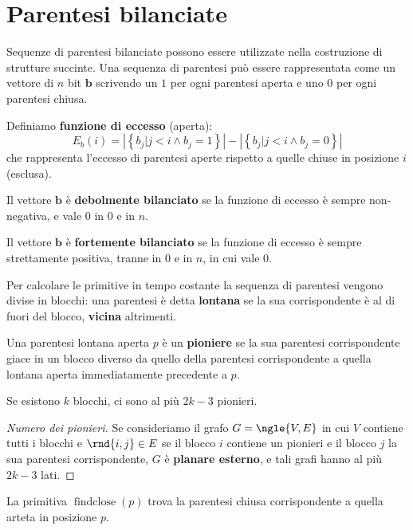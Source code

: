 \documentclass[\main/main.tex]{subfiles}
\begin{document}
\section{Parentesi bilanciate}
\begin{multicols}{2}
\begin{definition}
    Sequenze di parentesi bilanciate possono essere utilizzate nella costruzione di strutture succinte. Una sequenza di parentesi può essere rappresentata come un vettore di \(n\) bit \(\bm{b}\) scrivendo un \(1\) per ogni parentesi aperta e uno \(0\) per ogni parentesi chiusa.
\end{definition}
\begin{definition}
    Definiamo \textbf{funzione di eccesso} (aperta):
    \[
        E_{b}(i)=\left|\left\{b_{j} | j<i \wedge b_{j}=1\right\}\right|-\left|\left\{b_{j} | j<i \wedge b_{j}=0\right\}\right|
    \]
    che rappresenta l'eccesso di parentesi aperte rispetto a quelle chiuse in posizione \(i\) (esclusa).
\end{definition}
\begin{property}
    Il vettore \(\bm{b}\) è \textbf{debolmente bilanciato} se la funzione di eccesso è sempre non-negativa, e vale \(0\) in \(0\) e in \(n\).
\end{property}
\begin{property}
    Il vettore \(\bm{b}\) è \textbf{fortemente bilanciato} se la funzione di eccesso è sempre strettamente positiva, tranne in \(0\) e in \(n\), in cui vale 0.
\end{property}
\begin{definition}
    Per calcolare le primitive in tempo costante la sequenza di parentesi vengono divise in blocchi: una parentesi è detta \textbf{lontana} se la sua corrispondente è al di fuori del blocco, \textbf{vicina} altrimenti.
\end{definition}
\begin{definition}[Pioniere]
    Una parentesi lontana aperta \(p\) è un \textbf{pioniere} se la sua parentesi corrispondente giace in un blocco diverso da quello della parentesi corrispondente a quella lontana aperta immediatamente precedente a \(p\).
\end{definition}
\begin{lemma}
    Se esistono \(k\) blocchi, ci sono al più \(2k-3\) pionieri.
\end{lemma}
\begin{proof}[Numero dei pionieri]
    Se consideriamo il grafo \(G = \ngle{V, E}\) in cui \(V\) contiene tutti i blocchi e \(\rnd{i,j} \in E\) se il blocco \(i\) contiene un pionieri e il blocco \(j\) la sua parentesi corrispondente, \(G\) è \textbf{planare esterno}, e tali grafi hanno al più \(2k-3\) lati.
\end{proof}
\begin{definition}[Findclose]
    La primitiva \(\operatorname{findclose}(p)\) trova la parentesi chiusa corrispondente a quella arteta in posizione \(p\).
    

\end{definition}
\end{multicols}
\end{document}
